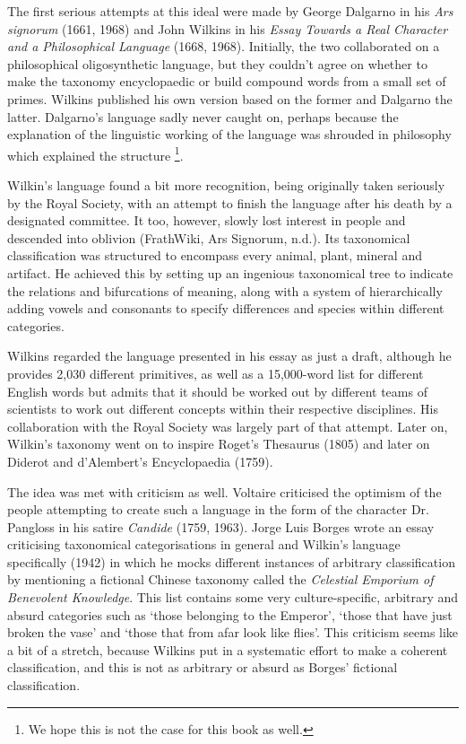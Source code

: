 The first serious attempts at this ideal were made by George Dalgarno in his {\it Ars signorum} (1661, 1968) and John Wilkins in his \textit{Essay Towards a Real Character and a Philosophical Language} (1668, 1968). Initially, the two collaborated on a philosophical oligosynthetic language, but they couldn’t agree on whether to make the taxonomy encyclopaedic or build compound words from a small set of primes. Wilkins published his own version based on the former and Dalgarno the latter. Dalgarno’s language sadly never caught on, perhaps because the explanation of the linguistic working of the language was shrouded in philosophy which explained the structure \footnote{We hope this is not the case for this book as well.}. 

Wilkin’s language found a bit more recognition, being originally taken seriously by the Royal Society, with an attempt to finish the language after his death by a designated committee. It too, however, slowly lost interest in people and descended into oblivion  (FrathWiki, Ars Signorum, n.d.). Its taxonomical classification was structured to encompass every animal, plant, mineral and artifact. He achieved this by setting up an ingenious taxonomical tree to indicate the relations and bifurcations of meaning, along with a system of hierarchically adding vowels and consonants to specify differences and species within different categories. 

Wilkins regarded the language presented in his essay as just a draft, although he provides 2,030 different primitives, as well as a 15,000-word list for different English words but admits that it should be worked out by different teams of scientists to work out different concepts within their respective disciplines. His collaboration with the Royal Society was largely part of that attempt. Later on, Wilkin’s taxonomy went on to inspire Roget’s Thesaurus (1805) and later on Diderot and d’Alembert’s Encyclopaedia (1759).  

The idea was met with criticism as well. Voltaire criticised the optimism of the people attempting to create such a language in the form of the character Dr. Pangloss in his satire \textit{Candide} (1759, 1963). Jorge Luis Borges wrote an essay criticising taxonomical categorisations in general and Wilkin’s language specifically (1942) in which he mocks different instances of arbitrary classification by mentioning a fictional Chinese taxonomy called the \textit{Celestial Emporium of Benevolent Knowledge}. This list contains some very culture-specific, arbitrary and absurd categories such as ‘those belonging to the Emperor’, ‘those that have just broken the vase’ and ‘those that from afar look like flies’. This criticism seems like a bit of a stretch, because Wilkins put in a systematic effort to make a coherent classification, and this is not as arbitrary or absurd as Borges’ fictional classification. 

